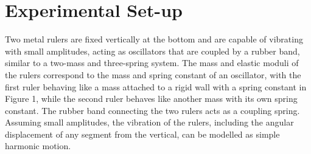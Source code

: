 \chapter{\label{method}Experimental Set-up}
Two metal rulers are fixed vertically at the bottom and are capable of vibrating with small amplitudes, acting as oscillators that are coupled by a rubber band, similar to a two-mass and three-spring system. The mass and elastic moduli of the rulers correspond to the mass and spring constant of an oscillator, with the first ruler behaving like a mass attached to a rigid wall with a spring constant in Figure 1, while the second ruler behaves like another mass with its own spring constant. The rubber band connecting the two rulers acts as a coupling spring. Assuming small amplitudes, the vibration of the rulers, including the angular displacement of any segment from the vertical, can be modelled as simple harmonic motion. 

